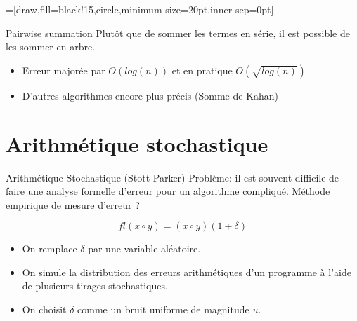\documentclass{beamer}
\begin{document}
=[draw,fill=black!15,circle,minimum size=20pt,inner sep=0pt]

\begin{frame}{Pairwise summation}
    Plutôt que de sommer les termes en série, il est possible de les sommer en arbre.

    \begin{itemize}
        \item Erreur majorée par $O(log(n))$ et en pratique $O(\sqrt{log(n)})$
        \item D'autres algorithmes encore plus précis (Somme de Kahan)
    \end{itemize}
\end{frame}

\section{Arithmétique stochastique}

\begin{frame}{Arithmétique Stochastique (Stott Parker)}
    Problème: il est souvent difficile de faire une analyse formelle d'erreur pour un algorithme compliqué. Méthode empirique de mesure d'erreur ?

    \[ fl(x \circ y ) = (x \circ y)(1+\delta) \]

    \begin{itemize}
        \item On remplace $\delta$ par une variable aléatoire.

        \item On simule la distribution des erreurs arithmétiques d'un programme à
              l'aide de plusieurs tirages stochastiques.

        \item On choisit $\delta$ comme un bruit uniforme de magnitude $u$.
    \end{itemize}
\end{frame}
\end{document}
